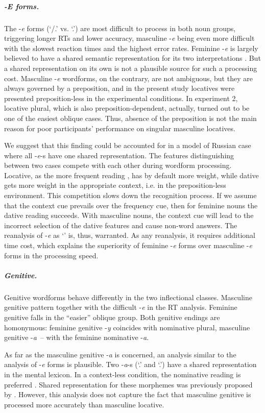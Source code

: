 \documentclass[output=paper, modfonts,newtxmath,hidelinks]{langscibook}
\begin{document}
\subparagraph*{{-E forms.}} The -\textit{e} forms (`\datt/\locc.\fem' vs. `\locc.\masc') are most difficult to process in both noun groups, triggering longer RTs and lower accuracy, masculine -\textit{e} being even more difficult with the slowest reaction times and the highest error rates. Feminine -\textit{e} is largely believed to have a shared semantic representation for its two interpretations \citep{muller2004decomposing, wiese2004categories, wunderlich2004there}. But a shared representation on its own is not a plausible source for such a processing cost. Masculine -\textit{e} wordforms, on the contrary, are not ambiguous, but they are always governed by a preposition, and in the present study locatives were presented preposition-less in the experimental conditions. In experiment 2, locative plural, which is also preposition-dependent, actually, turned out to be one of the easiest oblique cases. Thus, absence of the preposition is not the main reason for poor participants’ performance on singular masculine locatives. 

We suggest that this finding could be accounted for in a model of Russian case where all -\textit{e}-s have one shared representation. The features distinguishing between two cases compete with each other during wordform processing. Locative, as the more frequent reading \citep{samojlova2014frequencies}, has by default more weight, while dative gets more weight in the appropriate context, i.e. in the preposition-less environment. This competition slows down the recognition process. If we assume that the context cue prevails over the frequency cue, then for feminine nouns the dative reading succeeds. With masculine nouns, the context cue will lead to the incorrect selection of the dative features and cause non-word answers. The reanalysis of -\textit{e} as `\locc' is, thus, warranted. As any reanalysis, it requires additional time cost, which explains the superiority of feminine -\textit{e} forms over masculine -\textit{e} forms in the processing speed. 

\subparagraph*{{Genitive.}} Genitive wordforms behave differently in the two inflectional classes. Masculine genitive  pattern together with the difficult -\textit{e} in the RT analysis. Feminine genitive falls in the “easier” oblique group. Both genitive endings are homonymous: feminine genitive -\textit{y} coincides with nominative plural, masculine genitive -\textit{a}~\--- with the feminine nominative -\textit{a}. 

As far as the masculine genitive -\textit{a} is concerned, an analysis similar to the analysis of -\textit{e} forms is plausible. Two -\textit{a}-s (`\genn.\masc' and `\nomm.\fem')
have a shared representation in the mental lexicon. In a context-less condition, the nominative reading is preferred . Shared representation for these morphemes was previously proposed by \citet{muller2004decomposing, wunderlich2004there}. However, this analysis does not capture the fact that masculine genitive is processed more accurately than masculine locative.
\end{document}
